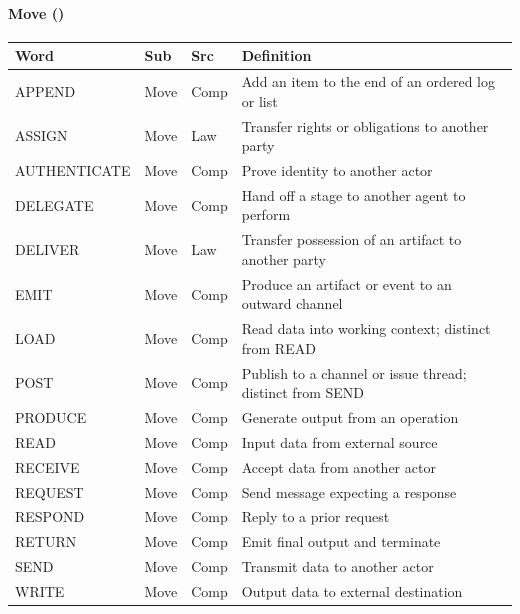 \documentclass{article}
\begin{document}
\paragraph{Move (\VocabVerbsMove)}
\small
\begin{tabular}{lllp{7cm}}
\toprule \textbf{Word} & \textbf{Sub} & \textbf{Src} & \textbf{Definition} \\ \midrule
APPEND & Move & Comp & Add an item to the end of an ordered log or list \\
ASSIGN & Move & Law & Transfer rights or obligations to another party \\
AUTHENTICATE & Move & Comp & Prove identity to another actor \\
DELEGATE & Move & Comp & Hand off a stage to another agent to perform \\
DELIVER & Move & Law & Transfer possession of an artifact to another party \\
EMIT & Move & Comp & Produce an artifact or event to an outward channel \\
LOAD & Move & Comp & Read data into working context; distinct from READ \\
POST & Move & Comp & Publish to a channel or issue thread; distinct from SEND \\
PRODUCE & Move & Comp & Generate output from an operation \\
READ & Move & Comp & Input data from external source \\
RECEIVE & Move & Comp & Accept data from another actor \\
REQUEST & Move & Comp & Send message expecting a response \\
RESPOND & Move & Comp & Reply to a prior request \\
RETURN & Move & Comp & Emit final output and terminate \\
SEND & Move & Comp & Transmit data to another actor \\
WRITE & Move & Comp & Output data to external destination \\
\bottomrule
\end{tabular}
\normalsize
\end{document}
